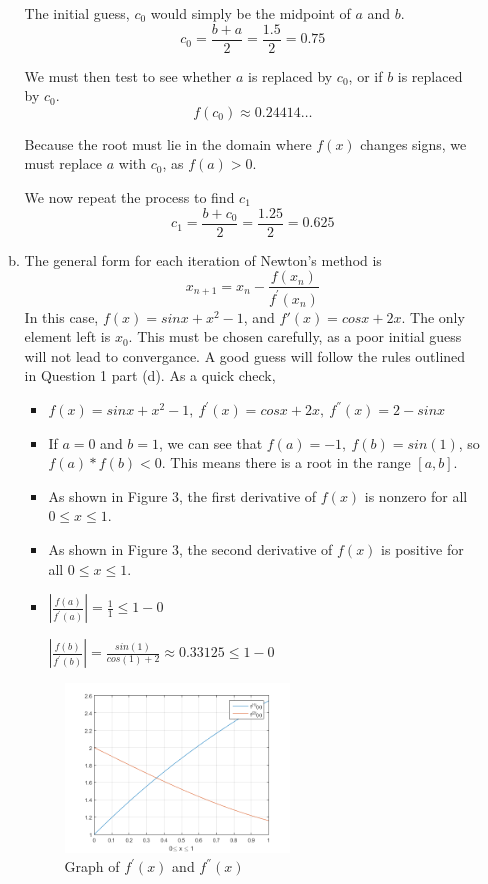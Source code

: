 \documentclass[11pt]{article}
\begin{document}
\begin{enumerate}
\begin{enumerate}[(a)]
		The initial guess, $c_0$ would simply be the midpoint of $a$ and $b$.
		$$c_0 = \frac{b+a}{2} = \frac{1.5}{2} = 0.75$$

		We must then test to see whether $a$ is replaced by $c_0$, or if $b$ is replaced by $c_0$.
		$$f(c_0) \approx 0.24414\dots$$

		Because the root must lie in the domain where $f(x)$ changes signs, we must replace $a$ with $c_0$, as $f(a) > 0$.

		We now repeat the process to find $c_1$
		$$c_1 = \frac{b+c_0}{2} = \frac{1.25}{2} = 0.625$$

		\item The general form for each iteration of Newton's method is
		$$x_{n+1} = x_n - \frac{f(x_n)}{f^{'}(x_n)} $$
		In this case, $f(x) = sinx + x^2 - 1$, and $f'(x) = cosx + 2x$. The only element left is $x_0$. This must be chosen
		carefully, as a poor initial guess will not lead to convergance. A good guess will follow the rules outlined in Question 1
		part (d). As a quick check,

		\begin{itemize}
			\item $f(x) = sinx + x^2 - 1,\ f^{'}(x) = cosx+2x,\ f^{''}(x) = 2-sinx$

			\item If $a = 0$ and $b=1$, we can see that $f(a) = -1,\ f(b) = sin(1)$, so $f(a)*f(b) < 0$. This means there is a
			root in the range $[a,b]$.

			\item As shown in Figure 3, the first derivative of $f(x)$ is nonzero for all $0 \leq x \leq 1$.

			\item As shown in Figure 3, the second derivative of $f(x)$ is positive for all $0 \leq x \leq 1$.

			\item $|\frac{f(a)}{f^{'}(a)}| = \frac{1}{1} \leq 1-0$

			$|\frac{f(b)}{f^{'}(b)}| = \frac{sin(1)}{cos(1) + 2} \approx 0.33125 \leq 1-0$

		\end{itemize}

		\begin{figure}[H]
			\centering
			\includegraphics[width=0.6\textwidth]{q2_derivgraph.png}
			\caption{Graph of $f^{'}(x)$ and $f^{''}(x)$}
		\end{figure}


\end{enumerate}
\end{enumerate}
\end{document}
